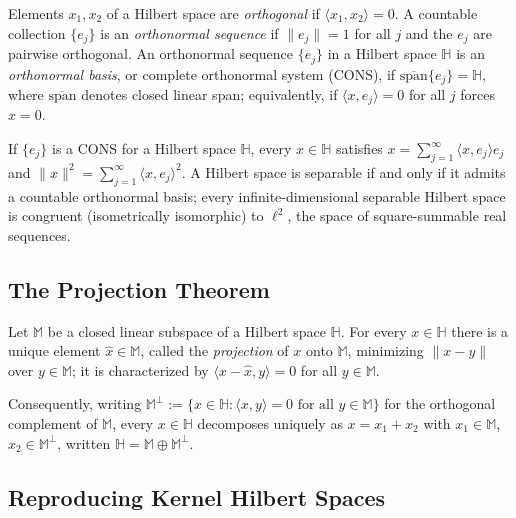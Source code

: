 \begin{definition}
Elements $x_1,x_2$ of a Hilbert space are \emph{orthogonal} if
$\langle x_1,x_2\rangle = 0$. A countable collection $\{e_j\}$ is an
\emph{orthonormal sequence} if $\|e_j\|=1$ for all $j$ and the $e_j$ are
pairwise orthogonal. An orthonormal sequence $\{e_j\}$ in a Hilbert space
$\mathbb{H}$ is an \emph{orthonormal basis}, or complete orthonormal system
(CONS), if $\overline{\mathrm{span}}\{e_j\} = \mathbb{H}$, where
$\overline{\mathrm{span}}$ denotes closed linear span; equivalently, if
$\langle x,e_j\rangle = 0$ for all $j$ forces $x=0$.
\end{definition}

\begin{theorem}
\label{thm:parseval}
If $\{e_j\}$ is a CONS for a Hilbert space $\mathbb{H}$, every
$x\in\mathbb{H}$ satisfies $x = \sum_{j=1}^\infty \langle x,e_j\rangle e_j$
and $\|x\|^2 = \sum_{j=1}^\infty \langle x,e_j\rangle^2$. A Hilbert space is
separable if and only if it admits a countable orthonormal basis; every
infinite-dimensional separable Hilbert space is congruent (isometrically
isomorphic) to $\ell^2$, the space of square-summable real sequences.
\end{theorem}

\subsection{The Projection Theorem}

\begin{theorem}
\label{thm:projection}
Let $\mathbb{M}$ be a closed linear subspace of a Hilbert space
$\mathbb{H}$. For every $x\in\mathbb{H}$ there is a unique element
$\hat{x}\in\mathbb{M}$, called the \emph{projection} of $x$ onto
$\mathbb{M}$, minimizing $\|x-y\|$ over $y\in\mathbb{M}$; it is
characterized by $\langle x-\hat{x},y\rangle = 0$ for all $y\in\mathbb{M}$.
\end{theorem}

Consequently, writing $\mathbb{M}^\perp := \{x\in\mathbb{H}:
\langle x,y\rangle=0 \text{ for all } y\in\mathbb{M}\}$ for the orthogonal
complement of $\mathbb{M}$, every $x\in\mathbb{H}$ decomposes uniquely as
$x = x_1+x_2$ with $x_1\in\mathbb{M}$, $x_2\in\mathbb{M}^\perp$, written
$\mathbb{H} = \mathbb{M}\oplus\mathbb{M}^\perp$.

\subsection{Reproducing Kernel Hilbert Spaces}
\label{subsec:rkhs_prelim}

